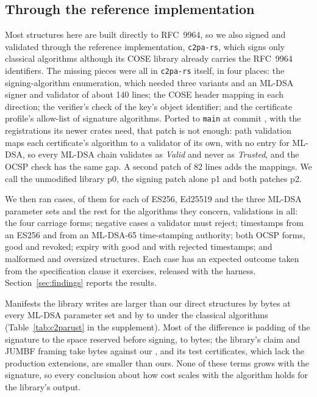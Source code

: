 \subsection{Through the reference implementation}
\label{sec:patch}

Most structures here are built directly to RFC~9964, so we also signed and
validated through the reference implementation, \texttt{c2pa-rs}, which signs
only classical algorithms although its COSE library already carries the
RFC~9964 identifiers. The missing pieces were all in \texttt{c2pa-rs} itself, in
four places: the signing-algorithm enumeration, which needed three variants
and an ML-DSA signer and validator of about 140 lines; the COSE header mapping
in each direction; the verifier's check of the key's object identifier; and
the certificate profile's allow-list of signature algorithms. Ported to
\texttt{main} at commit \texttt{\NvalCommit}, with the registrations its newer
crates need, that patch is not enough: path validation maps each certificate's algorithm to a
validator of its own, with no entry for ML-DSA, so every ML-DSA chain
validates as \emph{Valid} and never as \emph{Trusted}, and the OCSP check has
the same gap. A second patch of 82 lines adds the mappings. We call the
unmodified library p0, the signing patch alone p1 and both patches p2.

We then ran \Nvalcases{} cases, \NvalAllFive{} of them for each of ES256,
Ed25519 and the three ML-DSA parameter sets and the rest for the algorithms
they concern, \NvalRows{} validations in all: the four carriage forms;
negative cases a validator must reject; timestamps from an ES256 and from an
ML-DSA-65 time-stamping authority; both OCSP forms, good and revoked; expiry
with good and with rejected timestamps; and malformed and oversized
structures. Each case has an expected outcome taken from the specification
clause it exercises, released with the harness. Section~\ref{sec:findings}
reports the results.

Manifests the library writes are larger than our direct structures by
\Nlibgap{} bytes at every ML-DSA parameter set and by \NlibgapClassLo{} to
\NlibgapClassHi{} under the classical algorithms (Table~\ref{tab:c2parust} in
the supplement). Most of the difference is padding of the signature to the
space reserved before signing, \NlibpadLo{} to \NlibpadHi{} bytes; the
library's claim and JUMBF framing take \Nliboutside{} bytes against our
\Nouroutside, and its test certificates, which lack the production extensions,
are smaller than ours. None of these terms grows with the signature, so every
conclusion about how cost scales with the algorithm holds for the library's
output.
